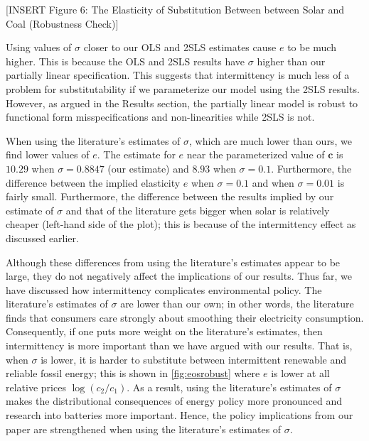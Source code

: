 \documentclass[11pt,a4paper,leqno]{extarticle}
\begin{document}
	
	\vspace{0.15in}
	\begin{center}
		[INSERT Figure 6: The Elasticity of Substitution Between between Solar and Coal \newline  (Robustness Check)]
	\end{center}
	\vspace{0.15in}
	
	Using values of $\sigma$ closer to our OLS and 2SLS estimates cause $e$ to be much higher. This is because the OLS and 2SLS results have $\sigma$ higher than our partially linear specification. This suggests that intermittency is much less of a problem for substitutability if we parameterize our model using the 2SLS results. However, as argued in the Results section, the partially linear model is robust to functional form misspecifications and non-linearities while 2SLS is not. 
	
	When using the literature's estimates of $\sigma$, which are much lower than ours, we find  lower values of  $e$. The estimate for $e$ near the parameterized value of $\mathbf{c}$ is  $10.29$ when $\sigma = 0.8847$ (our estimate) and $8.93$ when $\sigma = 0.1$. Furthermore, the difference between the implied elasticity $e$ when $\sigma = 0.1$ and when $\sigma = 0.01$ is fairly small. Furthermore, the difference between the results implied by our estimate of $\sigma$ and that of the literature gets  bigger when solar is relatively cheaper (left-hand side of the plot); this is because of the intermittency effect as discussed earlier.
	
	
	Although these differences from using the literature's estimates appear to be large, they do not negatively affect the implications of our results. Thus far, we have discussed how intermittency complicates environmental policy. The literature's estimates of $\sigma$ are lower than our own; in other words, the literature finds that consumers care strongly about smoothing their electricity consumption.  Consequently, if one puts more weight on the literature's estimates, then intermittency is more important than we have argued with our results. That is, when $\sigma$ is lower, it is harder to substitute between intermittent renewable and reliable fossil energy; this is shown in \autoref{fig:eosrobust} where $e$ is lower at all relative prices $\log(c_2/c_1)$. As a result, using the literature's estimates of $\sigma$ makes the distributional consequences of energy policy more pronounced and research into batteries more important. Hence, the policy implications from our paper are strengthened when using the literature's estimates of $\sigma$. 
	
\end{document}
